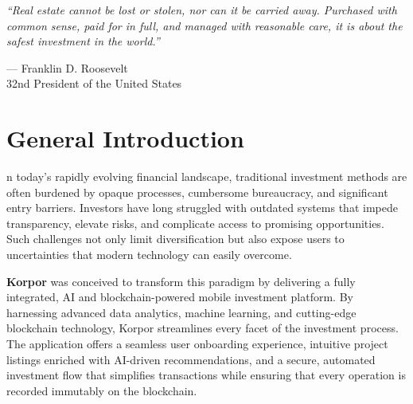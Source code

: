 \thispagestyle{empty}

\vspace*{\fill}

\begin{center}
\begin{minipage}{0.85\textwidth}
    \begin{center}
        \large\itshape ``Real estate cannot be lost or stolen, nor can it be carried away. Purchased with common sense, paid for in full, and managed with reasonable care, it is about the safest investment in the world.''\cite{RooseveltRealEstateQuote}
        
        \vspace{0.8cm}
        
        \normalfont\textcolor{primary}{— Franklin D. Roosevelt}\\
        \small\textcolor{secondary}{32nd President of the United States}
    \end{center}
\end{minipage}
\end{center}

\vspace*{\fill}

\newpage
\thispagestyle{empty}

\chapter*{\centering General Introduction}

\vspace{-1cm} %

\begingroup
\setlength{\parindent}{0pt}
\setlength{\parskip}{0.6em}
\small

n today's rapidly evolving financial landscape, traditional investment methods are often burdened by opaque processes, cumbersome bureaucracy, and significant entry barriers. Investors have long struggled with outdated systems that impede transparency, elevate risks, and complicate access to promising opportunities. Such challenges not only limit diversification but also expose users to uncertainties that modern technology can easily overcome.

\vspace{0.3cm}

\noindent \textbf{\textcolor{primary}{Korpor}} was conceived to transform this paradigm by delivering a fully integrated, AI and blockchain-powered mobile investment platform. By harnessing advanced data analytics, machine learning, and cutting-edge blockchain technology, Korpor streamlines every facet of the investment process. The application offers a seamless user onboarding experience, intuitive project listings enriched with AI-driven recommendations, and a secure, automated investment flow that simplifies transactions while ensuring that every operation is recorded immutably on the blockchain.

